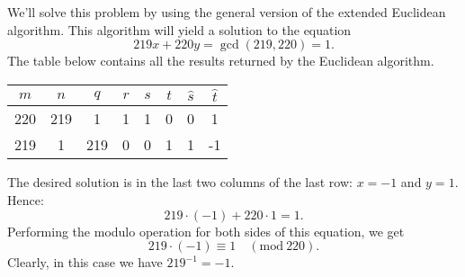 \documentclass[11pt]{article}
\newcommand{\Mod}{\mathrm{mod}\:}
\begin{document}
We'll solve this problem by using the general version of the extended Euclidean
algorithm. This algorithm will yield a solution to the equation
\begin{equation}
219x+220y=\gcd(219,220)=1.
\end{equation}
The table below contains all the results returned by the Euclidean algorithm.
\begin{center}
\begin{tabular}{|c|c|c|c|c|c|c|c|}
\hline
\(m\) & \(n\) & \(q\) & \(r\) & \(s\) & \(t\) & \(\hat{s}\) & \(\hat{t}\)\\
\hline
220 & 219 & 1 & 1 & 1 & 0 & 0 & 1\\
219 & 1 & 219 & 0 & 0 & 1 & 1 & -1\\
\hline
\end{tabular}
\end{center}
The desired solution is in the last two columns of the last row: \(x=-1\) and
\(y=1\). Hence:
\begin{equation}
219\cdot(-1)+220\cdot 1=1.
\end{equation}
Performing the modulo operation for both sides of this equation, we get
\begin{equation}
219\cdot(-1)\equiv 1\quad(\Mod 220).
\end{equation}
Clearly, in this case we have \(219^{-1}=-1\).
\end{document}
